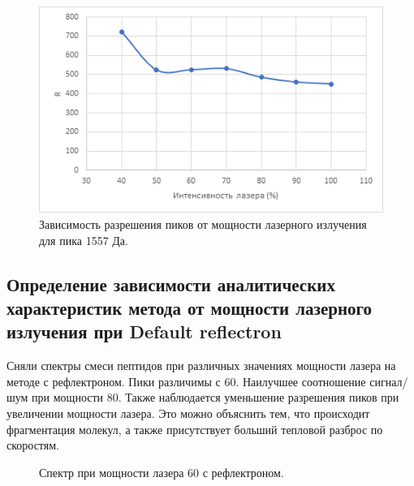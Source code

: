 \documentclass[12pt]{article}
\begin{document}
\begin{flushleft}
\begin{figure}[!h]
\begin{center}
\begin{minipage}[h]{0.4\linewidth}
\includegraphics[width=1.2\linewidth]{4}
\caption{Зависимость разрешения пиков от
мощности лазерного излучения для пика 1557 Да.}
\label{ris:experimcoded}
\end{minipage}
\end{center}
\end{figure}
\subsection{Определение зависимости аналитических характеристик метода от мощности лазерного излучения при Default reflectron}
Сняли спектры смеси пептидов при различных значениях
мощности лазера на методе с рефлектроном. Пики различимы с 60. Наилучшее соотношение сигнал/шум при мощности 80. Также наблюдается уменьшение разрешения пиков при увеличении мощности лазера. Это можно
объяснить тем, что происходит фрагментация молекул, а также присутствует больший
тепловой разброс по скоростям.
\begin{figure}[!h]
\caption{Спектр при мощности лазера 60 с рефлектроном.}
\label{ris:image}
\end{figure}
\newpage

\end{flushleft}
\end{document}
